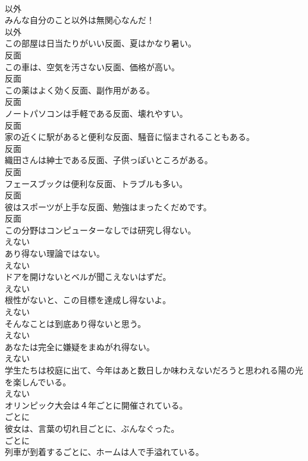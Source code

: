 \documentclass[8pt]{extreport}
\begin{document}
\begin{CJK}{UTF8}{min}
\\	以外
\\	みんな自分のこと以外は無関心なんだ！	
\\	以外
\\	この部屋は日当たりがいい反面、夏はかなり暑い。	
\\	反面
\\	この車は、空気を汚さない反面、価格が高い。	
\\	反面
\\	この薬はよく効く反面、副作用がある。	
\\	反面
\\	ノートパソコンは手軽である反面、壊れやすい。	
\\	反面
\\	家の近くに駅があると便利な反面、騒音に悩まされることもある。	
\\	反面
\\	織田さんは紳士である反面、子供っぽいところがある。	
\\	反面
\\	フェースブックは便利な反面、トラブルも多い。	
\\	反面
\\	彼はスポーツが上手な反面、勉強はまったくだめです。	
\\	反面
\\	この分野はコンピューターなしでは研究し得ない。	
\\	えない
\\	あり得ない理論ではない。	
\\	えない
\\	ドアを開けないとベルが聞こえないはずだ。	
\\	えない
\\	根性がないと、この目標を達成し得ないよ。	
\\	えない
\\	そんなことは到底あり得ないと思う。	
\\	えない
\\	あなたは完全に嫌疑をまぬがれ得ない。	
\\	えない
\\	学生たちは校庭に出て、今年はあと数日しか味わえないだろうと思われる陽の光を楽しんでいる。	
\\	えない
\\	オリンピック大会は４年ごとに開催されている。	
\\	ごとに
\\	彼女は、言葉の切れ目ごとに、ぶんなぐった。	
\\	ごとに
\\	列車が到着するごとに、ホームは人で手溢れている。	

\end{CJK}
\end{document}
